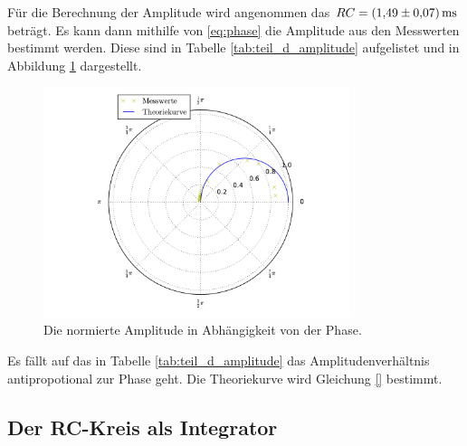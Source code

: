 Für die Berechnung der Amplitude wird angenommen das $RC=\SI{1.49\pm0.07}{\milli\second}$
beträgt. Es kann dann mithilfe von \eqref{eq:phase} die Amplitude aus den Messwerten bestimmt werden.
Diese sind in Tabelle \ref{tab:teil_d_amplitude} aufgelistet und in Abbildung \ref{fig:plot_teil_d} dargestellt.
\FloatBarrier

\FloatBarrier
\FloatBarrier
\begin{figure}
  \centering
  \includegraphics[width=0.8\textwidth]{pics/polarplot.pdf}
  \caption{Die normierte Amplitude in Abhängigkeit von der Phase.}
  \label{fig:plot_teil_d}
\end{figure}
\FloatBarrier
Es fällt auf das in Tabelle \ref{tab:teil_d_amplitude} das Amplitudenverhältnis
antipropotional zur Phase geht.
Die Theoriekurve wird Gleichung \eqref{} bestimmt.

\subsection{Der RC-Kreis als Integrator}

